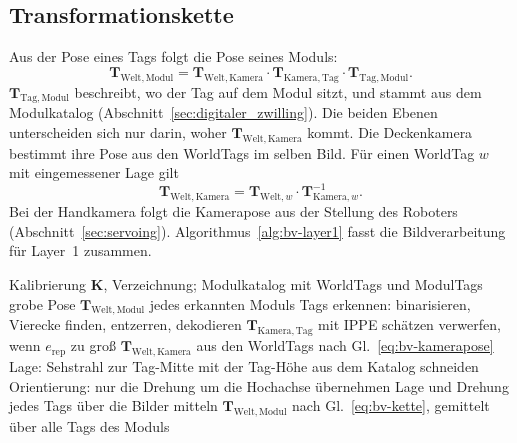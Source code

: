 \subsection{Transformationskette}
\label{subsec:bv-kette}
Aus der Pose eines Tags folgt die Pose seines Moduls:
\begin{equation}
    \mathbf{T}_{\mathrm{Welt,Modul}} = \mathbf{T}_{\mathrm{Welt,Kamera}} \cdot \mathbf{T}_{\mathrm{Kamera,Tag}} \cdot \mathbf{T}_{\mathrm{Tag,Modul}} .
    \label{eq:bv-kette}
\end{equation}
$\mathbf{T}_{\mathrm{Tag,Modul}}$ beschreibt, wo der Tag auf dem Modul sitzt, und stammt aus dem Modulkatalog (Abschnitt~\ref{sec:digitaler_zwilling}). Die beiden Ebenen unterscheiden sich nur darin, woher $\mathbf{T}_{\mathrm{Welt,Kamera}}$ kommt. Die Deckenkamera bestimmt ihre Pose aus den WorldTags im selben Bild. Für einen WorldTag $w$ mit eingemessener Lage gilt
\begin{equation}
    \mathbf{T}_{\mathrm{Welt,Kamera}} = \mathbf{T}_{\mathrm{Welt},w} \cdot \mathbf{T}_{\mathrm{Kamera},w}^{-1} .
    \label{eq:bv-kamerapose}
\end{equation}
Bei der Handkamera folgt die Kamerapose aus der Stellung des Roboters (Abschnitt~\ref{sec:servoing}). Algorithmus~\ref{alg:bv-layer1} fasst die Bildverarbeitung für Layer~1 zusammen.

\renewcommand{\algorithmicrequire}{\textbf{Eingabe:}}
\renewcommand{\algorithmicensure}{\textbf{Ausgabe:}}
\begin{algorithm}[htbp]
    \caption{Lokalisierung der Module mit der Deckenkamera (Layer~1)}
    \label{alg:bv-layer1}
    \begin{algorithmic}[1]
        \Require Kalibrierung $\mathbf{K}$, Verzeichnung; Modulkatalog mit WorldTags und ModulTags
        \Ensure grobe Pose $\mathbf{T}_{\mathrm{Welt,Modul}}$ jedes erkannten Moduls
            \State Tags erkennen: binarisieren, Vierecke finden, entzerren, dekodieren
                \State $\mathbf{T}_{\mathrm{Kamera,Tag}}$ mit IPPE schätzen
                \State verwerfen, wenn $e_{\mathrm{rep}}$ zu groß
            \EndFor
            \State $\mathbf{T}_{\mathrm{Welt,Kamera}}$ aus den WorldTags nach Gl.~\eqref{eq:bv-kamerapose}
                \State Lage: Sehstrahl zur Tag-Mitte mit der Tag-Höhe aus dem Katalog schneiden
                \State Orientierung: nur die Drehung um die Hochachse übernehmen
            \EndFor
        \EndFor
        \State Lage und Drehung jedes Tags über die Bilder mitteln
            \State $\mathbf{T}_{\mathrm{Welt,Modul}}$ nach Gl.~\eqref{eq:bv-kette}, gemittelt über alle Tags des Moduls
        \EndFor
    \end{algorithmic}
\end{algorithm}

